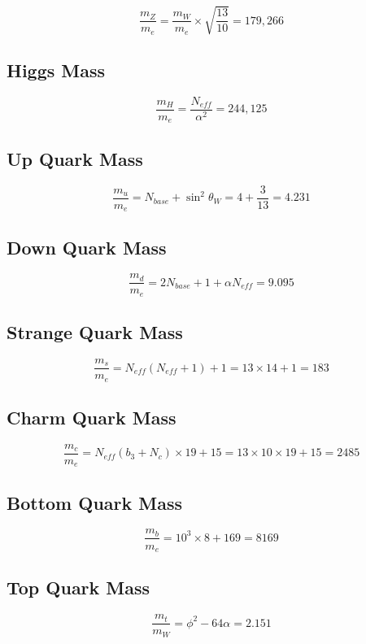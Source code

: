 \documentclass[
  11pt,
  letterpaper,
  twoside,
  openany]{book}
\makeatletter
\let\orig@subsection\subsection
\renewcommand{\subsection}{\needspace{6\baselineskip}\orig@subsection}
\makeatother
\begin{document}
\[
\frac{m_Z}{m_e} = \frac{m_W}{m_e} \times \sqrt{\frac{13}{10}} = 179{,}266
\]

\subsection{Higgs Mass}\label{higgs-mass}

\[
\frac{m_H}{m_e} = \frac{N_{eff}}{\alpha^2} = 244{,}125
\]

\subsection{Up Quark Mass}\label{up-quark-mass}

\[
\frac{m_u}{m_e} = N_{base} + \sin^2\theta_W = 4 + \frac{3}{13} = 4.231
\]

\subsection{Down Quark Mass}\label{down-quark-mass}

\[
\frac{m_d}{m_e} = 2N_{base} + 1 + \alpha N_{eff} = 9.095
\]

\subsection{Strange Quark Mass}\label{strange-quark-mass}

\[
\frac{m_s}{m_e} = N_{eff}(N_{eff}+1) + 1 = 13 \times 14 + 1 = 183
\]

\subsection{Charm Quark Mass}\label{charm-quark-mass}

\[
\frac{m_c}{m_e} = N_{eff}(b_3+N_c) \times 19 + 15 = 13 \times 10 \times 19 + 15 = 2485
\]

\subsection{Bottom Quark Mass}\label{bottom-quark-mass}

\[
\frac{m_b}{m_e} = 10^3 \times 8 + 169 = 8169
\]

\subsection{Top Quark Mass}\label{top-quark-mass}

\[
\frac{m_t}{m_W} = \phi^2 - 64\alpha = 2.151
\]
\end{document}
